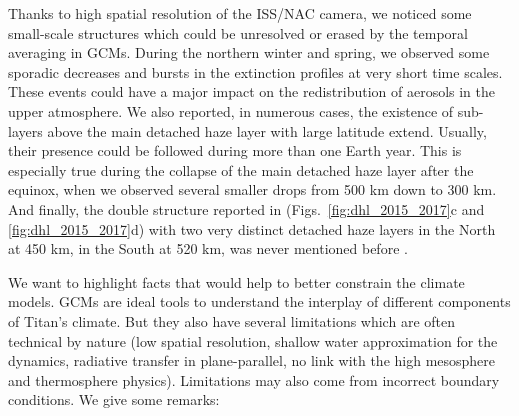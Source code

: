 Thanks to high spatial resolution of the ISS/NAC camera, we noticed some small-scale structures which could be unresolved or
erased by the temporal averaging in GCMs. During the northern winter and spring, we observed some sporadic decreases and
bursts in the extinction profiles at very short time scales. These events could have a major impact on the redistribution of
aerosols in the upper atmosphere. We also reported, in numerous cases, the existence of sub-layers above the main detached
haze layer with large latitude extend. Usually, their presence could be followed during more than one Earth year. This is
especially true during the collapse of the main detached haze layer after the equinox, when we observed several smaller
drops from 500 km down to 300 km. And finally, the double structure reported in 
(Figs.~\ref{fig:dhl_2015_2017}c and \ref{fig:dhl_2015_2017}d) with two very distinct detached haze layers in the
North at 450 km, in the South at 520 km, was never mentioned before .

We want to highlight facts that would help to better constrain the climate models.
GCMs are ideal tools to understand the interplay of different components of Titan's climate.
But they also have several limitations which are often technical by nature (low spatial resolution, shallow water
approximation for the dynamics, radiative transfer in plane-parallel, no link with the high mesosphere and thermosphere physics).
Limitations may also come from incorrect boundary conditions. We give some remarks:

